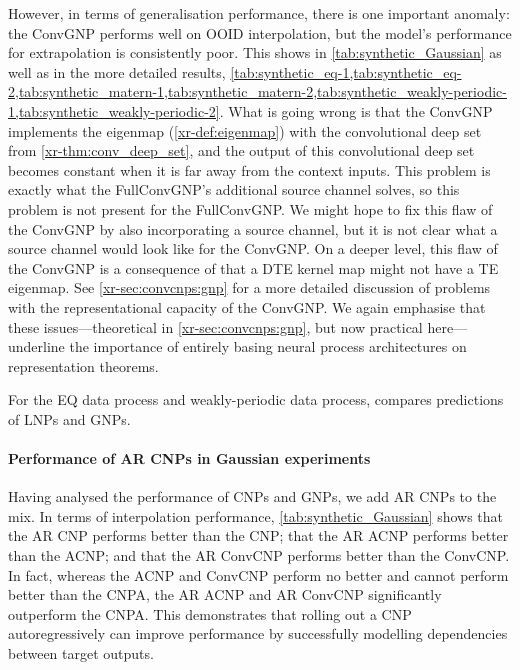 \documentclass[12pt, twoside]{report}
\newcommand{\xrprefix}[1]{xr-#1}
\begin{document}
\afterpage{\FloatBarrier}

However, in terms of generalisation performance, there is one important anomaly:
the ConvGNP performs well on OOID interpolation,
but the model's performance for extrapolation is consistently poor.
This shows in \cref{tab:synthetic_Gaussian} as well as in the more detailed results, \cref{tab:synthetic_eq-1,tab:synthetic_eq-2,tab:synthetic_matern-1,tab:synthetic_matern-2,tab:synthetic_weakly-periodic-1,tab:synthetic_weakly-periodic-2}.
What is going wrong is that the ConvGNP implements the eigenmap (\cref{\xrprefix{def:eigenmap}}) with the convolutional deep set from \cref{\xrprefix{thm:conv_deep_set}}, and the output of this convolutional deep set becomes constant when it is far away from the context inputs.
This problem is exactly what the FullConvGNP's additional source channel solves, so this problem is not present for the FullConvGNP.
We might hope to fix this flaw of the ConvGNP by also incorporating a source channel,
but it is not clear what a source channel would look like for the ConvGNP.
On a deeper level, this flaw of the ConvGNP is a consequence of that a DTE kernel map might not have a TE eigenmap.
See \cref{\xrprefix{sec:convcnps:gnp}} for a more detailed discussion of problems with the representational capacity of the ConvGNP. 
We again emphasise that these issues---theoretical in \cref{\xrprefix{sec:convcnps:gnp}}, but now practical here---underline the importance of entirely basing neural process architectures on representation theorems.

For the EQ data process and weakly-periodic data process,
 compares predictions of LNPs and GNPs.

\paragraph{Performance of AR CNPs in Gaussian experiments}
Having analysed the performance of CNPs and GNPs, we add AR CNPs to the mix.
In terms of interpolation performance, \cref{tab:synthetic_Gaussian} shows that the AR CNP performs better than the CNP; that the AR ACNP performs better than the ACNP; and that the AR ConvCNP performs better than the ConvCNP.
In fact, whereas the ACNP and ConvCNP perform no better and cannot perform better than the CNPA, the AR ACNP and AR ConvCNP significantly outperform the CNPA.
This demonstrates that rolling out a CNP autoregressively can improve performance by successfully modelling dependencies between target outputs.
\end{document}
